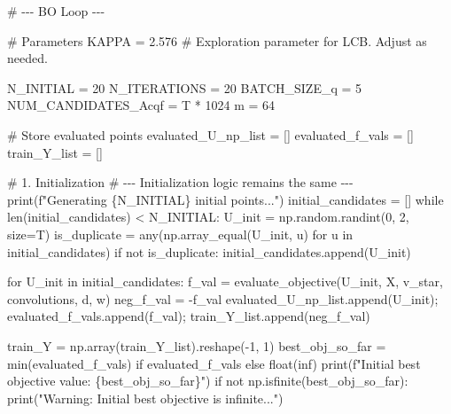 \documentclass[
  letterpaper,
  DIV=11,
  numbers=noendperiod]{scrartcl}
\newenvironment{Shaded}{\begin{snugshade}}{\end{snugshade}}
\newcommand{\BuiltInTok}[1]{\textcolor[rgb]{0.00,0.23,0.31}{#1}}
\newcommand{\CommentTok}[1]{\textcolor[rgb]{0.37,0.37,0.37}{#1}}
\newcommand{\ControlFlowTok}[1]{\textcolor[rgb]{0.00,0.23,0.31}{#1}}
\newcommand{\DecValTok}[1]{\textcolor[rgb]{0.68,0.00,0.00}{#1}}
\newcommand{\FloatTok}[1]{\textcolor[rgb]{0.68,0.00,0.00}{#1}}
\newcommand{\KeywordTok}[1]{\textcolor[rgb]{0.00,0.23,0.31}{#1}}
\newcommand{\NormalTok}[1]{\textcolor[rgb]{0.00,0.23,0.31}{#1}}
\newcommand{\OperatorTok}[1]{\textcolor[rgb]{0.37,0.37,0.37}{#1}}
\newcommand{\SpecialCharTok}[1]{\textcolor[rgb]{0.37,0.37,0.37}{#1}}
\newcommand{\SpecialStringTok}[1]{\textcolor[rgb]{0.13,0.47,0.30}{#1}}
\newcommand{\StringTok}[1]{\textcolor[rgb]{0.13,0.47,0.30}{#1}}
\begin{document}
\begin{Shaded}
\begin{Highlighting}[]
\CommentTok{\# {-}{-}{-} BO Loop {-}{-}{-}}

\CommentTok{\# Parameters}
\NormalTok{KAPPA }\OperatorTok{=} \FloatTok{2.576} \CommentTok{\# Exploration parameter for LCB. Adjust as needed.}

\NormalTok{N\_INITIAL }\OperatorTok{=} \DecValTok{20}
\NormalTok{N\_ITERATIONS }\OperatorTok{=} \DecValTok{20}
\NormalTok{BATCH\_SIZE\_q }\OperatorTok{=} \DecValTok{5}
\NormalTok{NUM\_CANDIDATES\_Acqf }\OperatorTok{=}\NormalTok{ T }\OperatorTok{*} \DecValTok{1024}
\NormalTok{m }\OperatorTok{=} \DecValTok{64}

\CommentTok{\# Store evaluated points}
\NormalTok{evaluated\_U\_np\_list }\OperatorTok{=}\NormalTok{ []}
\NormalTok{evaluated\_f\_vals }\OperatorTok{=}\NormalTok{ []}
\NormalTok{train\_Y\_list }\OperatorTok{=}\NormalTok{ []}

\CommentTok{\# 1. Initialization}
\CommentTok{\# {-}{-}{-} Initialization logic remains the same {-}{-}{-}}
\BuiltInTok{print}\NormalTok{(}\SpecialStringTok{f"Generating }\SpecialCharTok{\{}\NormalTok{N\_INITIAL}\SpecialCharTok{\}}\SpecialStringTok{ initial points..."}\NormalTok{)}
\NormalTok{initial\_candidates }\OperatorTok{=}\NormalTok{ []}
\ControlFlowTok{while} \BuiltInTok{len}\NormalTok{(initial\_candidates) }\OperatorTok{\textless{}}\NormalTok{ N\_INITIAL:}
\NormalTok{    U\_init }\OperatorTok{=}\NormalTok{ np.random.randint(}\DecValTok{0}\NormalTok{, }\DecValTok{2}\NormalTok{, size}\OperatorTok{=}\NormalTok{T)}
\NormalTok{    is\_duplicate }\OperatorTok{=} \BuiltInTok{any}\NormalTok{(np.array\_equal(U\_init, u) }\ControlFlowTok{for}\NormalTok{ u }\KeywordTok{in}\NormalTok{ initial\_candidates)}
    \ControlFlowTok{if} \KeywordTok{not}\NormalTok{ is\_duplicate: initial\_candidates.append(U\_init)}

\ControlFlowTok{for}\NormalTok{ U\_init }\KeywordTok{in}\NormalTok{ initial\_candidates:}
\NormalTok{    f\_val }\OperatorTok{=}\NormalTok{ evaluate\_objective(U\_init, X, v\_star, convolutions, d, w)}
\NormalTok{    neg\_f\_val }\OperatorTok{=} \OperatorTok{{-}}\NormalTok{f\_val}
\NormalTok{    evaluated\_U\_np\_list.append(U\_init)}\OperatorTok{;}\NormalTok{ evaluated\_f\_vals.append(f\_val)}\OperatorTok{;}\NormalTok{ train\_Y\_list.append(neg\_f\_val)}

\NormalTok{train\_Y }\OperatorTok{=}\NormalTok{ np.array(train\_Y\_list).reshape(}\OperatorTok{{-}}\DecValTok{1}\NormalTok{, }\DecValTok{1}\NormalTok{)}
\NormalTok{best\_obj\_so\_far }\OperatorTok{=} \BuiltInTok{min}\NormalTok{(evaluated\_f\_vals) }\ControlFlowTok{if}\NormalTok{ evaluated\_f\_vals }\ControlFlowTok{else} \BuiltInTok{float}\NormalTok{(}\StringTok{\textquotesingle{}inf\textquotesingle{}}\NormalTok{)}
\BuiltInTok{print}\NormalTok{(}\SpecialStringTok{f"Initial best objective value: }\SpecialCharTok{\{}\NormalTok{best\_obj\_so\_far}\SpecialCharTok{\}}\SpecialStringTok{"}\NormalTok{)}
\ControlFlowTok{if} \KeywordTok{not}\NormalTok{ np.isfinite(best\_obj\_so\_far): }\BuiltInTok{print}\NormalTok{(}\StringTok{"Warning: Initial best objective is infinite..."}\NormalTok{)}



\end{Highlighting}
\end{Shaded}
\end{document}
